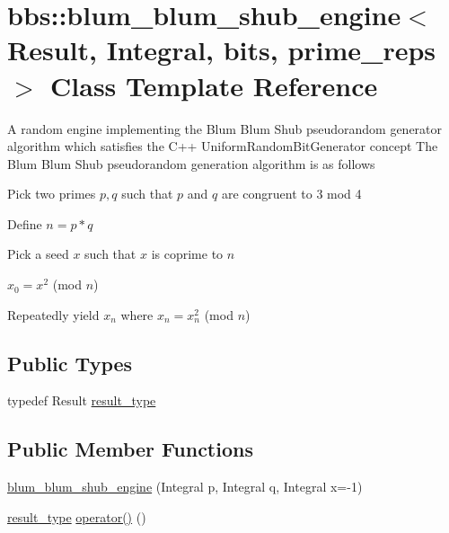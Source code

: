 \hypertarget{classbbs_1_1blum__blum__shub__engine}{}\section{bbs\+:\+:blum\+\_\+blum\+\_\+shub\+\_\+engine$<$ Result, Integral, bits, prime\+\_\+reps $>$ Class Template Reference}
\label{classbbs_1_1blum__blum__shub__engine}


A random engine implementing the Blum Blum Shub pseudorandom generator algorithm which satisfies the C++ Uniform\+Random\+Bit\+Generator concept The Blum Blum Shub pseudorandom generation algorithm is as follows
\begin{DoxyEnumerate}
\item Pick two primes $ p, q $ such that $ p $ and $ q $ are congruent to 3 mod 4
\item Define $ n = p * q $
\item Pick a seed $ x $ such that $ x $ is coprime to $ n $
\item $ x_0 = x^2$ (mod $ n $)
\item Repeatedly yield $ x_n $ where $ x_n = x_n^2 $ (mod $ n $) 
\end{DoxyEnumerate} 


\subsection*{Public Types}
\begin{DoxyCompactItemize}
\item 
typedef Result \hyperlink{classbbs_1_1blum__blum__shub__engine_af8f60205a8a8b5cee055ed54d5739805}{result\+\_\+type}
\end{DoxyCompactItemize}
\subsection*{Public Member Functions}
\begin{DoxyCompactItemize}
\item 
\hyperlink{classbbs_1_1blum__blum__shub__engine_a6560d8c40e0f42f72adce96fdf2cba34}{blum\+\_\+blum\+\_\+shub\+\_\+engine} (Integral p, Integral q, Integral x=-\/1)
\item 
\hyperlink{classbbs_1_1blum__blum__shub__engine_af8f60205a8a8b5cee055ed54d5739805}{result\+\_\+type} \hyperlink{classbbs_1_1blum__blum__shub__engine_a78164c5ee3e7c0d1b2e8070029e33ec7}{operator()} ()
\end{DoxyCompactItemize}
